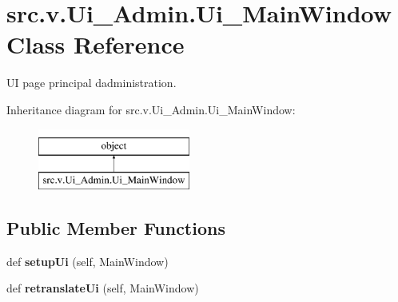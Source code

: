 \hypertarget{classsrc_1_1v_1_1_ui___admin_1_1_ui___main_window}{}\section{src.\+v.\+Ui\+\_\+\+Admin.\+Ui\+\_\+\+Main\+Window Class Reference}
\label{classsrc_1_1v_1_1_ui___admin_1_1_ui___main_window}


U\+I page principal d\textquotesingle{}administration.  


Inheritance diagram for src.\+v.\+Ui\+\_\+\+Admin.\+Ui\+\_\+\+Main\+Window\+:\begin{figure}[H]
\begin{center}
\leavevmode
\includegraphics[height=2.000000cm]{classsrc_1_1v_1_1_ui___admin_1_1_ui___main_window}
\end{center}
\end{figure}
\subsection*{Public Member Functions}
\begin{DoxyCompactItemize}
\item 
\hypertarget{classsrc_1_1v_1_1_ui___admin_1_1_ui___main_window_a47d3b208b5d7de28183d1e11fa6d2f3c}{}def {\bfseries setup\+Ui} (self, Main\+Window)\label{classsrc_1_1v_1_1_ui___admin_1_1_ui___main_window_a47d3b208b5d7de28183d1e11fa6d2f3c}

\item 
\hypertarget{classsrc_1_1v_1_1_ui___admin_1_1_ui___main_window_a176f03c9dab0ee8184b7d417f010fa91}{}def {\bfseries retranslate\+Ui} (self, Main\+Window)\label{classsrc_1_1v_1_1_ui___admin_1_1_ui___main_window_a176f03c9dab0ee8184b7d417f010fa91}

\end{DoxyCompactItemize}
